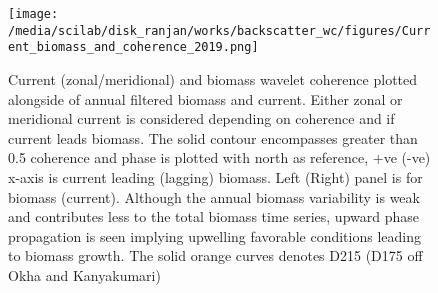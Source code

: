 \documentclass{article}
\begin{document}
\begin{figure}[htbp]
	\centering
	\texttt{[image: /media/scilab/disk\_ranjan/works/backscatter\_wc/figures/Current\_biomass\_and\_coherence\_2019.png]} 
	\captionsetup{justification=justified,font=footnotesize,skip=0.05\baselineskip,width=\textwidth}
	\caption{Current (zonal/meridional) and biomass wavelet coherence plotted alongside of annual filtered biomass and current. Either zonal or meridional current is considered depending on coherence and if current leads biomass. The solid contour encompasses greater than 0.5 coherence and phase is plotted with north as reference, +ve (-ve) x-axis is current leading (lagging) biomass. Left (Right) panel is for biomass (current). Although the annual biomass variability is weak and contributes less to the total biomass time series, upward phase propagation is seen implying upwelling favorable conditions leading to biomass growth. The solid orange curves denotes D215 (D175 off Okha and Kanyakumari)}
	\label{fig:biomasscurrentcoh}
\end{figure}
\end{document}
